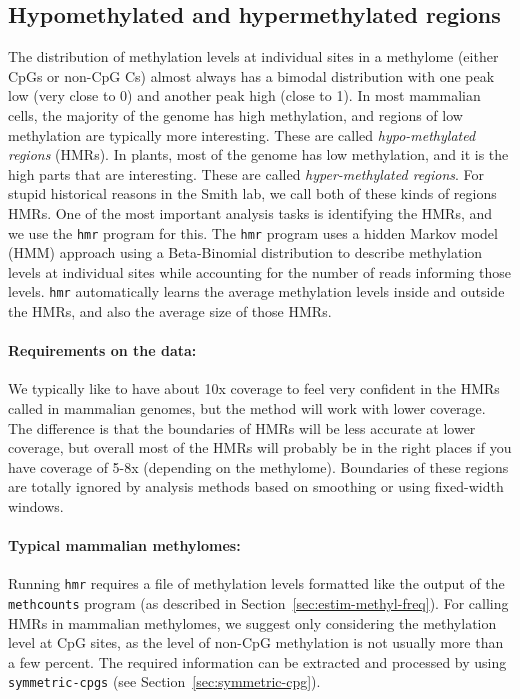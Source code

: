 \documentclass[10pt]{article}
\newcommand{\prog}[1]{\texttt{#1}}
\begin{document}
\subsection{Hypomethylated and hypermethylated regions}
\label{sec:indent-hypo-methyl}

The distribution of methylation levels at individual sites in a
methylome (either CpGs or non-CpG Cs) almost always has a bimodal
distribution with one peak low (very close to 0) and another peak high
(close to 1). In most mammalian cells, the majority of the genome has
high methylation, and regions of low methylation are typically more
interesting. These are called {\em hypo-methylated regions} (HMRs). In
plants, most of the genome has low methylation, and it is the high
parts that are interesting. These are called {\em hyper-methylated
regions}. For stupid historical reasons in the Smith lab, we call
both of these kinds of regions HMRs. One of the most important
analysis tasks is identifying the HMRs, and we use the \prog{hmr}
program for this. The \prog{hmr} program uses a hidden Markov model
(HMM) approach using a Beta-Binomial distribution to describe
methylation levels at individual sites while accounting for the number
of reads informing those levels. \prog{hmr} automatically learns the
average methylation levels inside and outside the HMRs, and also the
average size of those HMRs.

\paragraph{Requirements on the data:}
We typically like to have about 10x coverage to feel very confident in
the HMRs called in mammalian genomes, but the method will work with
lower coverage. The difference is that the boundaries of HMRs will be
less accurate at lower coverage, but overall most of the HMRs will
probably be in the right places if you have coverage of 5-8x
(depending on the methylome). Boundaries of these regions are totally
ignored by analysis methods based on smoothing or using fixed-width
windows.

\paragraph{Typical mammalian methylomes:}
Running \prog{hmr} requires a file of methylation levels formatted
like the output of the \prog{methcounts} program (as described
in Section~\ref{sec:estim-methyl-freq}). 
For calling HMRs in mammalian methylomes, we suggest only
considering the methylation level at CpG sites, as the level of non-CpG
methylation is not usually more than a few percent. The required information
can be extracted and processed by using \texttt{symmetric-cpgs} 
(see Section~\ref{sec:symmetric-cpg}). 
\end{document}
